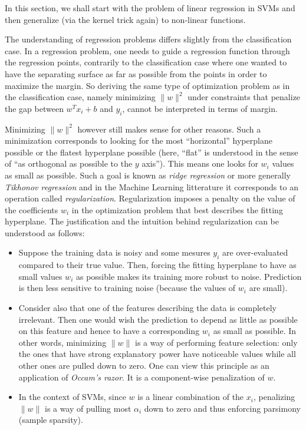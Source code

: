 \documentclass{article}
\begin{document}
In this section, we shall start with the problem of linear regression in SVMs and then generalize (via the kernel trick again) to non-linear functions.

The understanding of regression problems differs slightly from the classification case. In a regression problem, one needs to guide a regression function through the regression points, contrarily to the classification case where one wanted to have the separating surface as far as possible from the points in order to maximize the margin. So deriving the same type of optimization problem as in the classification case, namely minimizing $\|w\|^2$ under constraints that penalize the gap between $w^Tx_i+b$ and $y_i$, cannot be interpreted in terms of margin.

Minimizing $\|w\|^2$ however still makes sense for other reasons. Such a minimization corresponds to looking for the most ``horizontal'' hyperplane possible or the flatest hyperplane possible (here, ``flat'' is understood in the sense of ``as orthogonal as possible to the $y$ axis''). This means one looks for $w_i$ values as small as possible. Such a goal is known as \emph{ridge regression} or more generally \emph{Tikhonov regression} and in the Machine Learning litterature it corresponds to an operation called \emph{regularization}. Regularization imposes a penalty on the value of the coefficients $w_i$ in the optimization problem that best describes the fitting hyperplane. The justification and the intuition behind regularization can be understood as follows:
\begin{itemize}
\item Suppose the training data is noisy and some mesures $y_i$ are over-evaluated compared to their true value. Then, forcing the fitting hyperplane to have as small values $w_i$ as possible makes its training more robust to noise. Prediction is then less sensitive to training noise (because the values of $w_i$ are small).
\item Consider also that one of the features describing the data is completely irrelevant. Then one would wish the prediction to depend as little as possible on this feature and hence to have a corresponding $w_i$ as small as possible. In other words, minimizing $\|w\|$ is a way of performing feature selection: only the ones that have strong explanatory power have noticeable values while all other ones are pulled down to zero. One can view this principle as an application of \emph{Occam's razor}. It is a component-wise penalization of $w$.
\item In the context of SVMs, since $w$ is a linear combination of the $x_i$, penalizing $\|w\|$ is a way of pulling most $\alpha_i$ down to zero and thus enforcing parsimony (sample sparsity).
\end{itemize}
\end{document}
